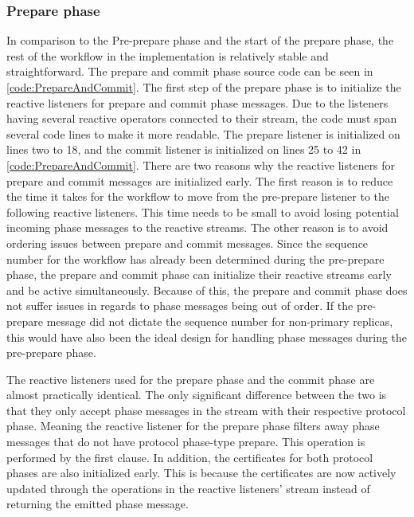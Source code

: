 \iffalse
\subsubsection{Prepare phase}
In comparison to the Pre-prepare phase and the start of the prepare phase, the rest of the workflow in the implementation is relatively stable and straightforward. The prepare and commit phase source code can be seen in \autoref{code:PrepareAndCommit}. The first step of the prepare phase is to initialize the reactive listeners for prepare and commit phase messages. Due to the listeners having several reactive operators connected to their stream, the code must span several code lines to make it more readable. The prepare listener is initialized on lines two to 18, and the commit listener is initialized on lines 25 to 42 in \autoref{code:PrepareAndCommit}. There are two reasons why the reactive listeners for prepare and commit messages are initialized early. The first reason is to reduce the time it takes for the workflow to move from the pre-prepare listener to the following reactive listeners. This time needs to be small to avoid losing potential incoming phase messages to the reactive streams. 
The other reason is to avoid ordering issues between prepare and commit messages. Since the sequence number for the workflow has already been determined during the pre-prepare phase, the prepare and commit phase can initialize their reactive streams early and be active simultaneously. Because of this, the prepare and commit phase does not suffer issues in regards to phase messages being out of order. If the pre-prepare message did not dictate the sequence number for non-primary replicas, this would have also been the ideal design for handling phase messages during the pre-prepare phase.

The reactive listeners used for the prepare phase and the commit phase are almost practically identical. The only significant difference between the two is that they only accept phase messages in the stream with their respective protocol phase. Meaning the reactive listener for the prepare phase filters away phase messages that do not have protocol phase-type prepare. This operation is performed by the first  clause. In addition, the certificates for both protocol phases are also initialized early. This is because the certificates are now actively updated through the operations in the reactive listeners’ stream instead of returning the emitted phase message.

